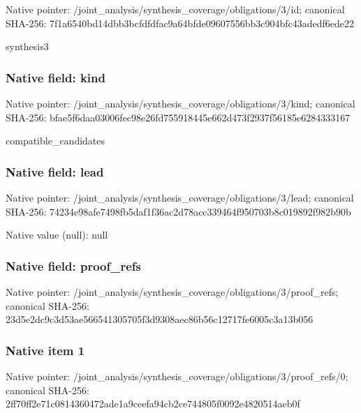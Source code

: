 \documentclass[10pt,a4paper]{article}
\begin{document}
Native pointer: /joint\_analysis/synthesi\allowbreak{}s\_coverage/obligations/3\allowbreak{}/id; canonical SHA-256: 7f1a6540bd14dbb3bcfdfdfa\allowbreak{}c9a64bfde09607556bb3c904\allowbreak{}bfc43adedf6ede22


synthesis3


\subsubsection{Native field: kind}


Native pointer: /joint\_analysis/synthesi\allowbreak{}s\_coverage/obligations/3\allowbreak{}/kind; canonical SHA-256: bfae5f6daa03006fec98e26f\allowbreak{}d755918445e662d473f2937f\allowbreak{}56185e6284333167


compatible\_candidates


\subsubsection{Native field: lead}


Native pointer: /joint\_analysis/synthesi\allowbreak{}s\_coverage/obligations/3\allowbreak{}/lead; canonical SHA-256: 74234e98afe7498fb5daf1f3\allowbreak{}6ac2d78acc339464f950703b\allowbreak{}8c019892f982b90b



Native value (null): null



\subsubsection{Native field: proof\_refs}


Native pointer: /joint\_analysis/synthesi\allowbreak{}s\_coverage/obligations/3\allowbreak{}/proof\_refs; canonical SHA-256: 23d5e2dc9c3d53ae56654130\allowbreak{}5705f3d9308aec86b56c1271\allowbreak{}7fe6005c3a13b056



\subsubsection{Native item 1}


Native pointer: /joint\_analysis/synthesi\allowbreak{}s\_coverage/obligations/3\allowbreak{}/proof\_refs/0; canonical SHA-256: 2ff70ff2e71c0814360472ad\allowbreak{}e1a9ceefa94cb2ce744805f0\allowbreak{}092e4820514aeb0f
\end{document}
